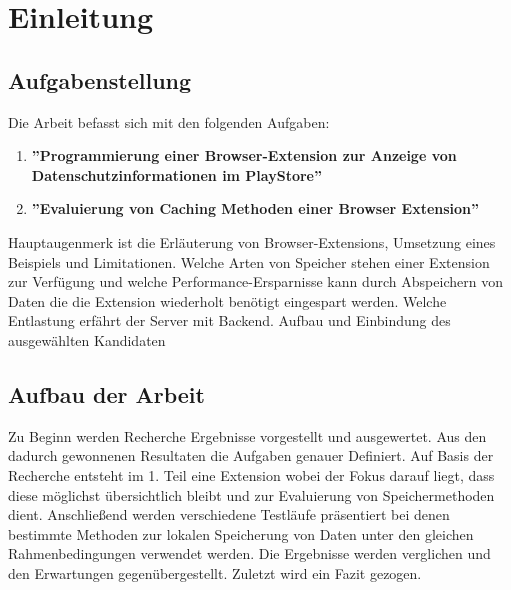 \chapter{Einleitung}
\label{c:einleitung}



\section{Aufgabenstellung}
\label{s:aufgabenstellung}

Die Arbeit befasst sich mit den folgenden Aufgaben:
\begin{enumerate}
	\item \textbf{''Programmierung einer Browser-Extension zur Anzeige von Datenschutzinformationen im PlayStore''}
	\item \textbf{''Evaluierung von Caching Methoden einer Browser Extension''}
\end{enumerate}

Hauptaugenmerk ist die Erläuterung von Browser-Extensions, Umsetzung eines Beispiels und Limitationen.
Welche Arten von Speicher stehen einer Extension zur Verfügung und welche Performance-Ersparnisse kann durch Abspeichern von Daten die die Extension wiederholt benötigt eingespart werden. Welche Entlastung erfährt der Server mit Backend. Aufbau und Einbindung des ausgewählten Kandidaten


\section{Aufbau der Arbeit}
\label{s:aufbauderarbeit}

Zu Beginn werden Recherche Ergebnisse vorgestellt und ausgewertet.  Aus den dadurch gewonnenen Resultaten die Aufgaben genauer Definiert. Auf Basis der Recherche entsteht im 1. Teil eine Extension wobei der Fokus darauf liegt, dass diese möglichst übersichtlich bleibt und zur Evaluierung von Speichermethoden dient. Anschließend werden verschiedene Testläufe präsentiert bei denen bestimmte Methoden zur lokalen Speicherung von Daten unter den gleichen Rahmenbedingungen verwendet werden. Die Ergebnisse werden verglichen und den Erwartungen gegenübergestellt. Zuletzt wird ein Fazit gezogen.

















